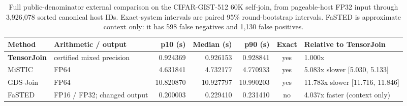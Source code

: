 \begin{table}[t]
\centering
\caption{Full public-denominator external comparison on the CIFAR-GIST-512 60K self-join, from pageable-host FP32 input through 3,926,078 sorted canonical host IDs. Exact-system intervals are paired 95\% round-bootstrap intervals. FaSTED is approximate context only: it has 598 false negatives and 1,130 false positives.}
\label{tab:external-full-public}
\small
\setlength{\tabcolsep}{4.5pt}
\begin{tabular}{llrrrcl}
\toprule
Method & Arithmetic / output & p10 (s) & Median (s) & p90 (s) & Exact & Relative to TensorJoin \\
\midrule
\textbf{TensorJoin} & certified mixed precision & 0.924369 & 0.926153 & 0.928841 & yes & 1.000x \\
MiSTIC & FP64 & 4.631841 & 4.732177 & 4.770933 & yes & 5.083x slower [5.030, 5.133] \\
GDS-Join & FP64 & 10.820870 & 10.927797 & 10.990203 & yes & 11.783x slower [11.716, 11.846] \\
FaSTED & FP16 / FP32; changed output & 0.200003 & 0.229410 & 0.231410 & no & 4.037x faster (context only) \\
\bottomrule
\end{tabular}
\end{table}
